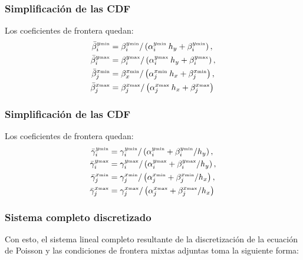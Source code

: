 \begin{frame}
\frametitle{Simplificación de las CDF}
Los coeficientes de frontera quedan:
\begin{equation}
\begin{aligned}
\bar{\beta}_{i}^{y {\text{\tiny{min}}}} &= \beta_{i}^{y {\text{\tiny{min}}}} / \left( \alpha_{i}^{y {\text{\tiny{min}}}} \: h_{y}  + \beta_{i}^{y{\mbox{\tiny{min}}}} \right), \\
\bar{\beta}_{i}^{y {\text{\tiny{max}}}} &= \beta_{i}^{y {\text{\tiny{max}}}} / \left( \alpha_{i}^{y {\text{\tiny{max}}}} \: h_{y}  + \beta_{i}^{y{\mbox{\tiny{max}}}} \right), \\
\bar{\beta}_{j}^{x {\text{\tiny{min}}}} &= \beta_{x}^{x {\text{\tiny{min}}}} / \left( \alpha_{j}^{x {\text{\tiny{min}}}} \: h_{x}  + \beta_{j}^{x {\mbox{\tiny{min}}}} \right), \\
\bar{\beta}_{j}^{x {\text{\tiny{max}}}} &= \beta_{j}^{x {\text{\tiny{max}}}} / \left( \alpha_{j}^{x {\text{\tiny{max}}}} \: h_{x}  + \beta_{j}^{x {\mbox{\tiny{max}}}} \right)
\end{aligned}
\label{eq:ecuacion_13_08a}
\end{equation}
\end{frame}
\begin{frame}
\frametitle{Simplificación de las CDF}
Los coeficientes de frontera quedan:
\begin{equation}
\begin{aligned}
\bar{\gamma}_{i}^{y {\text{\tiny{min}}}} &= \gamma_{i}^{y {\text{\tiny{min}}}} / \left( \alpha_{i}^{y {\text{\tiny{min}}}} + \beta_{i}^{y{\text{\tiny{min}}}} / h_{y} \right), \\
\bar{\gamma}_{i}^{y {\text{\tiny{max}}}} &= \gamma_{i}^{y {\text{\tiny{max}}}} / \left( \alpha_{i}^{y {\text{\tiny{max}}}} + \beta_{i}^{y{\text{\tiny{max}}}} / h_{y} \right), \\
\bar{\gamma}_{j}^{x {\text{\tiny{min}}}} &= \gamma_{j}^{x {\text{\tiny{min}}}} / \left( \alpha_{j}^{x {\text{\tiny{min}}}} + \beta_{j}^{x {\text{\tiny{min}}}} / h_{x} \right), \\
\bar{\gamma}_{j}^{x {\text{\tiny{max}}}} &= \gamma_{j}^{x {\text{\tiny{max}}}} / \left( \alpha_{j}^{x {\text{\tiny{max}}}} + \beta_{j}^{x {\text{\tiny{max}}}} / h_{x} \right)
\end{aligned}
\label{eq:ecuacion_13_08b}
\end{equation}
\end{frame}
\begin{frame}
\frametitle{Sistema completo discretizado}
Con esto, el sistema lineal completo resultante de la discretización de la ecuación de Poisson y las condiciones de frontera mixtas adjuntas toma la siguiente forma:
\end{frame}
